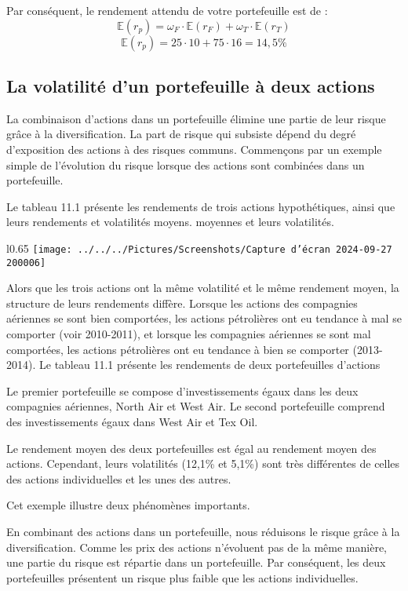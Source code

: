 \documentclass[a4paper, 12pt]{report}
\begin{document}
Par conséquent, le rendement attendu de votre portefeuille est de :
$$
\mathbb{E}(r_p)=\omega_F \cdot \mathbb{E}(r_F)+\omega_T \cdot \mathbb{E}(r_T)
$$
$$
\mathbb{E}(r_p)=25 \cdot 10+75\cdot 16=14,5\%
$$

\subsection{La volatilité d'un portefeuille à deux actions}

La combinaison d'actions dans un portefeuille élimine une partie de leur risque grâce à la diversification. La part de risque qui subsiste dépend du degré d'exposition des actions à des risques communs. Commençons par un exemple simple de l'évolution du risque lorsque des actions sont combinées dans un portefeuille. 

Le tableau 11.1 présente les rendements de trois actions hypothétiques, ainsi que leurs rendements et volatilités moyens.
moyennes et leurs volatilités.

\begin{wrapfigure}{l}{0.65\textwidth}
	\centering
	\texttt{[image: ../../../Pictures/Screenshots/Capture d'écran 2024-09-27 200006]}
\end{wrapfigure}
Alors que les trois actions ont la même volatilité et le même rendement moyen, la structure de leurs rendements diffère. Lorsque les actions des compagnies aériennes se sont bien comportées, les actions pétrolières ont eu tendance à mal se comporter (voir 2010-2011), et lorsque les compagnies aériennes se sont mal comportées, les actions pétrolières ont eu tendance à bien se comporter (2013-2014). Le tableau 11.1 présente les rendements de deux portefeuilles d'actions

Le premier portefeuille se compose d'investissements égaux dans les deux compagnies aériennes, North Air et West Air. Le second portefeuille comprend des investissements égaux dans West Air et Tex Oil.

Le rendement moyen des deux portefeuilles est égal au rendement moyen des actions. Cependant, leurs volatilités (12,1\% et 5,1\%) sont très différentes de celles des actions individuelles et les unes des autres.

Cet exemple illustre deux phénomènes importants.

En combinant des actions dans un portefeuille, nous réduisons le risque grâce à la diversification. Comme les prix des actions n'évoluent pas de la même manière, une partie du risque est répartie dans un portefeuille. Par conséquent, les deux portefeuilles présentent un risque plus faible que les actions individuelles.
\end{document}

